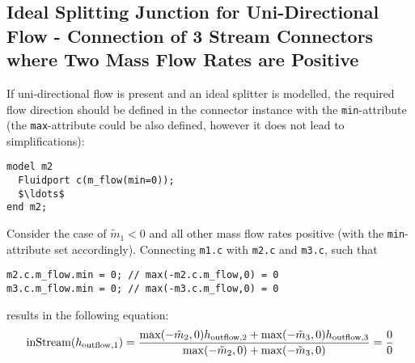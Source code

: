 \subsection{Ideal Splitting Junction for Uni-Directional Flow - Connection of 3 Stream Connectors where Two Mass Flow Rates are Positive}\label{connection-of-3-stream-connectors-where-two-mass-flow-rates-are-positive-ideal-splitting-junction-for-uni-directional-flow}\label{ideal-splitting-junction-for-uni-directional-flow-connection-of-3-stream-connectors-where-two-mass-flow-rates-are-positive}

If uni-directional flow is present and an ideal splitter is modelled, the required flow direction should be defined in the connector instance with the \lstinline!min!-attribute (the \lstinline!max!-attribute could be also defined, however it does not lead to simplifications):
\begin{lstlisting}[language=modelica]
model m2
  Fluidport c(m_flow(min=0));
  $\ldots$
end m2;
\end{lstlisting}

Consider the case of $\tilde{m}_{1} < 0$ and all other mass flow rates positive (with the \lstinline!min!-attribute set accordingly).
Connecting \lstinline!m1.c! with \lstinline!m2.c! and \lstinline!m3.c!, such that
\begin{lstlisting}[language=modelica]
m2.c.m_flow.min = 0; // max(-m2.c.m_flow,0) = 0
m3.c.m_flow.min = 0; // max(-m3.c.m_flow,0) = 0
\end{lstlisting}
results in the following equation:
\begin{equation*}
\text{\lstinline!inStream!}(h_{\mathrm{outflow},1})=\frac{\operatorname{max}(-\tilde{m}_2,0)h_{\mathrm{outflow},2}+\operatorname{max}(-\tilde{m}_3,0)h_{\mathrm{outflow},3}}{\operatorname{max}(-\tilde{m}_2,0)+\operatorname{max}(-\tilde{m}_3,0)}=\frac{0}{0}
\end{equation*}

